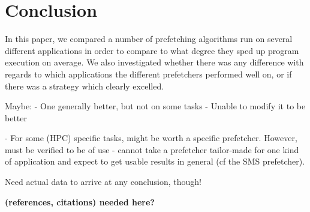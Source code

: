 
\section{Conclusion}
\label{sec:conclusion}

In this paper, we compared a number of prefetching algorithms run on
several different applications in order to compare to what degree they
sped up program execution on average. We also investigated whether
there was any difference with regards to which applications the
different prefetchers performed well on, or if there was a strategy
which clearly excelled. 

Maybe:
- One generally better, but not on some tasks
- Unable to modify it to be better

- For some (HPC) specific tasks, might be worth a specific
prefetcher. However, must be verified to be of use - cannot take a
prefetcher tailor-made for one kind of application and expect to get
usable results in general (cf the SMS prefetcher).


Need actual data to arrive at any conclusion,
though!

{\bf (references, citations) needed here?}

